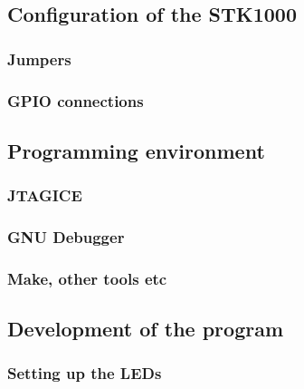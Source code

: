 
\subsection{Configuration of the STK1000}

    \subsubsection{Jumpers}

        

    \subsubsection{GPIO connections}

        

\subsection{Programming environment}

    \subsubsection{JTAGICE}

        

    \subsubsection{GNU Debugger}
        

    \subsubsection{Make, other tools etc}

\subsection{Development of the program}

    \subsubsection{Setting up the LEDs}
        
        

